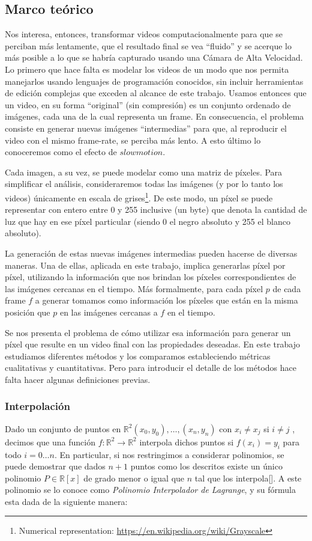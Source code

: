 \subsection{Marco teórico}
Nos interesa, entonces, transformar videos computacionalmente para que se perciban más lentamente, que el resultado final se vea ``fluido'' y se acerque lo más posible a lo que se habría capturado usando una Cámara de Alta Velocidad. Lo primero que hace falta es modelar los videos de un modo que nos permita manejarlos usando lenguajes de programación conocidos, sin incluir herramientas de edición complejas que exceden al alcance de este trabajo. Usamos entonces que un video, en su forma ``original'' (sin compresión) es un conjunto ordenado de imágenes, cada una de la cual representa un frame. En consecuencia, el problema consiste en generar nuevas imágenes ``intermedias'' para que, al reproducir el video con el mismo frame-rate, se perciba más lento. A esto \'ultimo lo conoceremos como el efecto de $slowmotion$.

Cada imagen, a su vez, se puede modelar como una matriz de píxeles. Para simplificar el análisis, consideraremos todas las imágenes (y por lo tanto los videos) únicamente en escala de grises\footnote{Numerical representation: \url{https://en.wikipedia.org/wiki/Grayscale}}. De este modo, un píxel se puede representar con entero entre 0 y 255 inclusive (un byte) que denota la cantidad de luz que hay en ese píxel particular (siendo 0 el negro absoluto y 255 el blanco absoluto).

La generación de estas nuevas imágenes intermedias pueden hacerse de diversas maneras. Una de ellas, aplicada en este trabajo, implica generarlas píxel por píxel, utilizando la información que nos brindan los píxeles correspondientes de las imágenes cercanas en el tiempo. Más formalmente, para cada píxel $p$ de cada frame $f$ a generar tomamos como información los píxeles que están en la misma posición que $p$ en las imágenes cercanas a $f$ en el tiempo.

Se nos presenta el problema de cómo utilizar esa información para generar un píxel que resulte en un video final con las propiedades deseadas. En este trabajo estudiamos diferentes métodos y los comparamos estableciendo métricas cualitativas y cuantitativas. Pero para introducir el detalle de los métodos hace falta hacer algunas definiciones previas.

\subsubsection{Interpolación}
Dado un conjunto de puntos en $\mathbb{R}^2 (x_0, y_0), \ldots, (x_n, y_n)$ con $x_i \neq x_j$ si $i \neq j$ , decimos que una función $f:\mathbb{R}^2 \rightarrow \mathbb{R}^2$ interpola dichos puntos si $f(x_i) = y_i$ para todo $i = 0 \ldots n$. En particular, si nos restringimos a considerar polinomios, se puede demostrar que dados $n + 1$ puntos como los descritos existe un único polinomio $P \in \mathbb{R}[x]$ de grado menor o igual que $n$ tal que los interpola[\cite{wiki_lagrange_polynomial}]. A este polinomio se lo conoce como \emph{Polinomio Interpolador de Lagrange}, y su fórmula esta dada de la siguiente manera:

